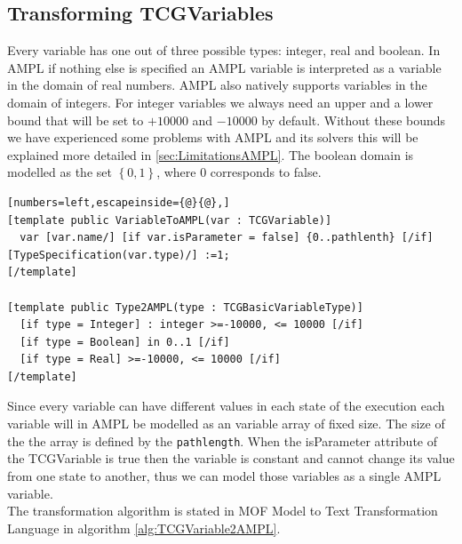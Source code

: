 \subsection{Transforming TCGVariables}
\label{sec:Variables2AMPL}
Every variable has one out of three possible types: integer, real and boolean. In AMPL if nothing else is specified an AMPL variable is interpreted as a variable in the domain of real numbers. AMPL also natively supports variables in the domain of integers. For integer variables we always need an upper and a lower bound that will be set to $+10000$ and $-10000$ by default. Without these bounds we have experienced some problems with AMPL and its solvers this will be explained more detailed in \ref{sec:LimitationsAMPL}. The boolean domain is modelled as the set $ \left\lbrace 0 , 1 \right\rbrace $, where 0 corresponds to false.\\
\begin{algorithm}
\begin{lstlisting}[numbers=left,escapeinside={@}{@},]
[template public VariableToAMPL(var : TCGVariable)]
  var [var.name/] [if var.isParameter = false] {0..pathlenth} [/if] [TypeSpecification(var.type)/] :=1;
[/template]

[template public Type2AMPL(type : TCGBasicVariableType)]
  [if type = Integer] : integer >=-10000, <= 10000 [/if]
  [if type = Boolean] in 0..1 [/if]
  [if type = Real] >=-10000, <= 10000 [/if]
[/template]
\end{lstlisting}
\caption{Model to text transformation from TCGVariable to AMPL model}
\label{alg:TCGVariable2AMPL}
\end{algorithm}
Since every variable can have different values in each state of the execution each variable will in AMPL be modelled as an variable array of fixed size. The size of the the array is defined by the \texttt{pathlength}. When the isParameter attribute of the TCGVariable is true then the variable is constant and cannot change its value from one state to another, thus we can model those variables as a single AMPL variable.\\
The transformation algorithm is stated in MOF Model to Text Transformation Language in algorithm \ref{alg:TCGVariable2AMPL}.

